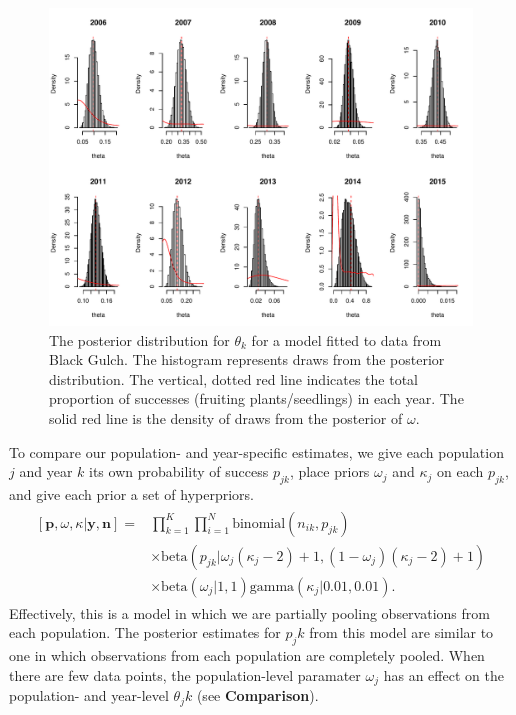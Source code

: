 \documentclass[12pt, oneside, titlepage]{article}   	%
\begin{document}
 \begin{figure}[h]
   \centering
       \includegraphics[page=1,width=.9\textwidth]{../figures/appendix-x-hierarchicalBG}  
    \caption{ The posterior distribution for $\theta_k$ for a model fitted to data from Black Gulch. The histogram represents draws from the posterior distribution. The vertical, dotted red line indicates the total proportion of successes (fruiting plants/seedlings) in each year. The solid red line is the density of draws from the posterior of $\omega$. }
 \label{fig:hierarchical-2}
\end{figure}

To compare our population- and year-specific estimates, we give each population $j$ and year $k$ its own probability of success $p_{jk}$, place priors $\omega_j$ and $\kappa_j$ on each $p_{jk}$, and give each prior a set of hyperpriors.
%
\begin{align}
  \begin{split}
[\bm{p},\omega,\kappa|\bm{y},\bm{n}]  = & \prod_{k=1}^K\prod_{i=1}^N \mathrm{binomial}(n_{ik},p_{jk}) 
    \\ & \times \mathrm{beta} (  p_{jk} | \omega_j(\kappa_j-2) +1 , (1-\omega_j) (\kappa_j -2) + 1) 
    \\ & \times \mathrm{beta} ( \omega_j | 1, 1) \mathrm{gamma} ( \kappa_j | 0.01, 0.01)  .
  \end{split}
\end{align}
%
Effectively, this is a model in which we are partially pooling observations from each population. The posterior estimates for $p_jk$ from this model are similar to one in which observations from each population are completely pooled. When there are few data points, the population-level paramater $\omega_j$ has an effect on the population- and year-level $\theta_jk$ (see \textbf{Comparison}).
\end{document}
